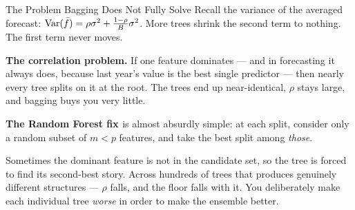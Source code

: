 \documentclass[aspectratio=169, 11pt]{beamer}
\begin{document}
\begin{frame}{The Problem Bagging Does Not Fully Solve}
  Recall the variance of the averaged forecast:
  $\operatorname{Var}(\bar{f}) = \rho\sigma^2 + \tfrac{1-\rho}{B}\sigma^2$. More trees shrink the second
  term to nothing. The first term never moves.
  \begin{warningbox}
    \textbf{The correlation problem.} If one feature dominates --- and in forecasting it
    always does, because last year's value is the best single predictor --- then nearly every
    tree splits on it at the root. The trees end up near-identical, $\rho$ stays large, and
    bagging buys you very little.
  \end{warningbox}

  \vspace{0.15cm}
  \textbf{The Random Forest fix \parencite{Breiman2001}} is almost absurdly simple: at each
  split, consider only a random subset of $m < p$ features, and take the best split among
  \emph{those}.

  \vspace{0.15cm}
  Sometimes the dominant feature is not in the candidate set, so the tree is forced to find
  its second-best story. Across hundreds of trees that produces genuinely different
  structures --- $\rho$ falls, and the floor falls with it. You deliberately make each
  individual tree \emph{worse} in order to make the ensemble better.
\end{frame}
\end{document}
